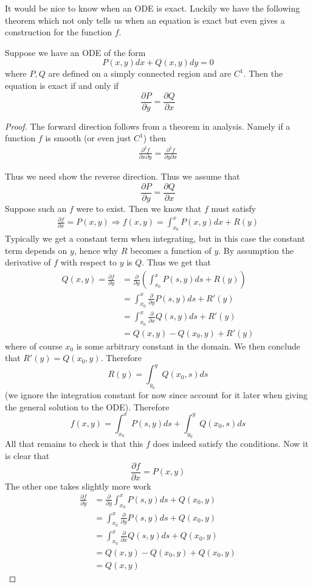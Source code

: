It would be nice to know when an ODE is exact. Luckily we have the following theorem which not only tells us when an equation is exact but even gives a construction for the function $f$.
\begin{theorem}
Suppose we have an ODE of the form
$$ P(x, y)dx + Q(x, y)dy = 0 $$
where $P, Q$ are defined on a simply connected region and are $C^1$. Then the equation is exact if and only if
$$ \frac{\partial P}{\partial y} = \frac{\partial Q}{\partial x} $$
\end{theorem}
\begin{proof}
The forward direction follows from a theorem in analysis. Namely if a function $f$ is smooth (or even just $C^1$) then
\begin{align*}
    \frac{\partial^2 f}{\partial x \partial y} = \frac{\partial^2 f}{\partial y \partial x}
\end{align*}

Thus we need show the reverse direction. Thus we assume that
$$ \frac{\partial P}{\partial y} = \frac{\partial Q}{\partial x} $$
Suppose such an $f$ were to exist. Then we know that $f$ must satisfy
\begin{align*}
    \frac{\partial f}{\partial x} = P(x, y) \Rightarrow f(x, y) = \int_{x_0}^{x} P(x, y)dx + R(y)
\end{align*}
Typically we get a constant term when integrating, but in this case the constant term depends on $y$, hence why $R$ becomes a function of $y$. By assumption the derivative of $f$ with respect to $y$ is $Q$. Thus we get that
\begin{align*}
    Q(x, y) = \frac{\partial f}{\partial y} &= \frac{\partial}{\partial y} \left( \int_{x_0}^{x} P(s, y)ds + R(y) \right)\\
    &= \int_{x_0}^{x} \frac{\partial}{\partial y} P(s, y)ds + R'(y)\\
    &= \int_{x_0}^x \frac{\partial }{\partial x} Q(s, y) ds + R'(y)\\
    &= Q(x, y) - Q(x_0, y) + R'(y)
\end{align*}
where of course $x_0$ is some arbitrary constant in the domain. We then conclude that $R'(y) = Q(x_0, y)$. Therefore
$$ R(y) = \int_{y_0}^{y} Q(x_0, s) ds $$
(we ignore the integration constant for now since account for it later when giving the general solution to the ODE). Therefore
$$ f(x, y) = \int_{x_0}^{x} P(s, y)ds + \int_{y_0}^{y} Q(x_0, s)ds $$
All that remains to check is that this $f$ does indeed satisfy the conditions. Now it is clear that
$$ \frac{\partial f}{\partial x} = P(x, y) $$
The other one takes slightly more work
\begin{align*}
    \frac{\partial f}{\partial y} &= \frac{\partial }{\partial y} \int_{x_0}^x P(s, y) ds + Q(x_0, y)\\
    &= \int_{x_0}^x \frac{\partial }{\partial y} P(s, y) ds + Q(x_0, y)\\
    &= \int_{x_0}^{x} \frac{\partial }{\partial x} Q(s, y) ds + Q(x_0, y)\\
    &= Q(x, y) - Q(x_0, y) + Q(x_0, y)\\
    &= Q(x, y)
\end{align*}
\end{proof}

